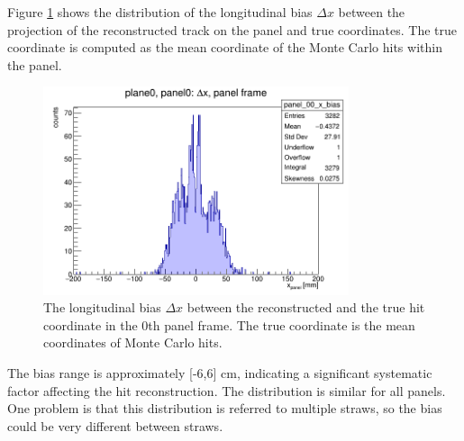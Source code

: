 Figure \ref{fig:bias} shows the distribution of the longitudinal bias $\Delta x$ between the projection 
of the reconstructed track on the panel and true coordinates. 
The true coordinate is computed as the mean coordinate of the Monte Carlo hits within the panel.
\begin{figure}[!h]
    \centering
    \includegraphics[width=0.8\textwidth]{figures/png/panel_00_x_bias.png}
    \caption[The bias between the reconstructed and the true hit coordinate.]{The longitudinal bias 
    $\Delta x$ between the reconstructed and the true hit coordinate in the 0th panel frame. 
    The true coordinate is the mean coordinates of Monte Carlo hits.}
    \label{fig:bias}
\end{figure}
The bias range is approximately [-6,6] cm, indicating a significant systematic factor 
affecting the hit reconstruction. The distribution is similar for all panels. 
One problem is that this distribution is referred to multiple straws, so the 
bias could be very different between straws.

